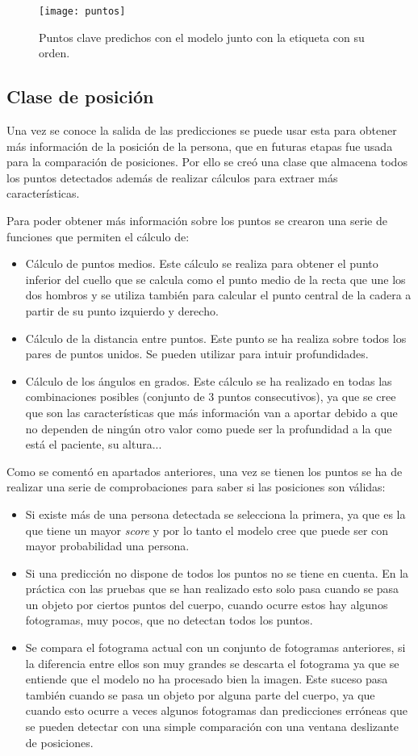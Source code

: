 \begin{figure}[h]
	\centering
	\texttt{[image: puntos]}
	\caption{Puntos clave predichos con el modelo junto con la etiqueta con su orden.}
	\label{fig:puntos}
\end{figure}
\subsection{Clase de posición}
Una vez se conoce la salida de las predicciones se puede usar esta para obtener más información de la posición de la persona, que en futuras etapas fue usada para la comparación de posiciones. Por ello se creó una clase que almacena todos los puntos detectados además de realizar cálculos para extraer más características.

Para poder obtener más información sobre los puntos se crearon una serie de funciones que permiten el cálculo de:
\begin{itemize}
	\item Cálculo de puntos medios. Este cálculo se realiza para obtener el punto inferior del cuello que se calcula como el punto medio de la recta que une los dos hombros y se utiliza también para calcular el punto central de la cadera a partir de su punto izquierdo y derecho.
	\item Cálculo de la distancia entre puntos. Este punto se ha realiza sobre todos los pares de puntos unidos. Se pueden utilizar para intuir profundidades.
	\item Cálculo de los ángulos en grados. Este cálculo se ha realizado en todas las combinaciones posibles (conjunto de 3 puntos consecutivos), ya que se cree que son las características que más información van a aportar debido a que no dependen de ningún otro valor como puede ser la profundidad a la que está el paciente, su altura...
\end{itemize}

Como se comentó en apartados anteriores, una vez se tienen los puntos se ha de realizar una serie de comprobaciones para saber si las posiciones son válidas:
\begin{itemize}
	\item Si existe más de una persona detectada se selecciona la primera, ya que es la que tiene un mayor \textit{score} y por lo tanto el modelo cree que puede ser con mayor probabilidad una persona.
	\item Si una predicción no dispone de todos los puntos no se tiene en cuenta. En la práctica con las pruebas que se han realizado esto solo pasa cuando se pasa un objeto por ciertos puntos del cuerpo, cuando ocurre estos hay algunos fotogramas, muy pocos, que no detectan todos los puntos.
	\item Se compara el fotograma actual con un conjunto de fotogramas anteriores, si la diferencia entre ellos son muy grandes se descarta el fotograma ya que se entiende que el modelo no ha procesado bien la imagen. Este suceso pasa también cuando se pasa un objeto por alguna parte del cuerpo, ya que cuando esto ocurre a veces algunos fotogramas dan predicciones erróneas que se pueden detectar con una simple comparación con una ventana deslizante de posiciones.
\end{itemize}


